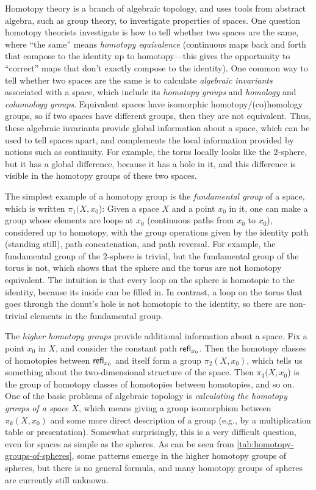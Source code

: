 %
Homotopy theory is a branch of algebraic topology, and uses tools from abstract algebra,
such as group theory, to investigate properties of spaces.  One question
homotopy theorists investigate is how to tell whether two spaces are the
same, where ``the same'' means \emph{homotopy equivalence}
%
(continuous
maps back and forth that compose to the identity up to homotopy---this
gives the opportunity to ``correct'' maps that don't exactly compose to
the identity).  One common way to tell whether two spaces are the same
is to calculate \emph{algebraic invariants} associated with a space,
which include its \emph{homotopy groups} and \emph{homology} and
\emph{cohomology groups}.
%
%
Equivalent spaces have isomorphic
homotopy/(co)homology groups, so if two spaces have different groups,
then they are not equivalent.  Thus, these algebraic invariants provide
global information about a space, which can be used to tell spaces
apart, and complements the local information provided by notions such as
continuity.  For example, the torus locally looks like the $2$-sphere, but it
has a global difference, because it has a hole in it, and this difference
is visible in the homotopy groups of these two spaces.

The simplest example of a homotopy group is the \emph{fundamental group}
%
of a space, which is written $\pi_1(X,x_0$): Given a space $X$ and a
point $x_0$ in it, one can make a group whose elements are loops at
$x_0$ (continuous paths from $x_0$ to $x_0$), considered up to homotopy, with the
group operations given by the identity path (standing still), path
concatenation, and path reversal.  For example, the fundamental group of
the $2$-sphere is trivial, but the fundamental group of the torus is not,
which shows that the sphere and the torus are not homotopy equivalent.
The intuition is that every loop on the sphere is homotopic to the
identity, because its inside can be filled in.  In contrast, a loop on
the torus that goes through the donut's hole is not homotopic to the
identity, so there are non-trivial elements in the fundamental group.

The \emph{higher homotopy groups} provide additional information about a
space.  Fix a point $x_0$ in $X$, and consider the constant path
$\mathsf{refl}_{x_0}$.  Then the homotopy classes of homotopies between $\mathsf{refl}_{x_0}$
and itself form a group $\pi_2(X,x_0)$, which tells us something about
the two-dimensional structure of the space.  Then $\pi_3(X,x_0$) is the
group of homotopy classes of homotopies between homotopies, and so on.
One of the basic problems of algebraic topology  is
\emph{calculating the homotopy groups of a space $X$}, which means
giving a group isomorphism between $\pi_k(X,x_0)$ and some more direct
description of a group (e.g., by a multiplication table or
presentation).  Somewhat surprisingly, this is a very difficult
question, even for spaces as simple as the spheres.  As can be seen from
\cref{tab:homotopy-groups-of-spheres}, some patterns emerge in the
higher homotopy groups of spheres, but there is no general formula, and
many homotopy groups of spheres are currently still unknown.


